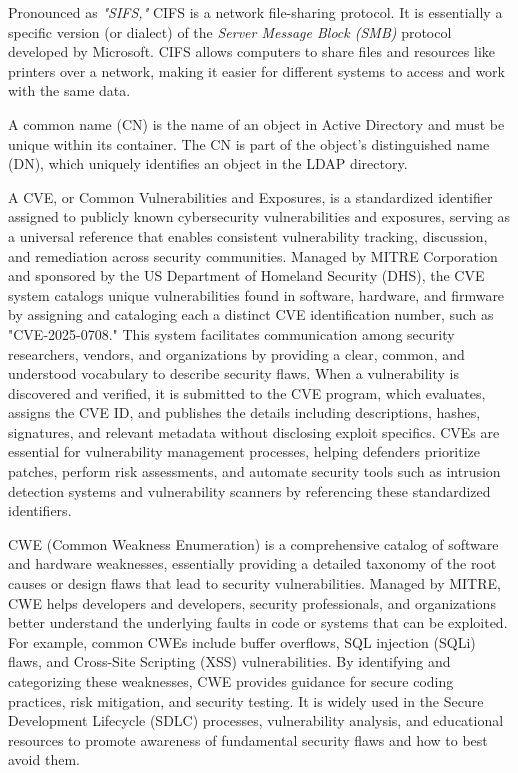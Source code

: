   Pronounced as \textit{"SIFS,"} CIFS is a network file-sharing protocol. It is essentially a specific version (or dialect) of the \textit{Server Message Block (SMB)} protocol developed by Microsoft. CIFS allows computers to share files and resources like printers over a network, making it easier for different systems to access and work with the same data.

 A common name (CN) is the name of an object in Active Directory and must be unique within its container. The CN is part of the object’s distinguished name (DN), which uniquely identifies an object in the LDAP directory. 

 A CVE, or Common Vulnerabilities and Exposures, is a standardized identifier assigned to publicly known cybersecurity vulnerabilities and exposures, serving as a universal reference that enables consistent vulnerability tracking, discussion, and remediation across security communities. Managed by MITRE Corporation and sponsored by the US Department of Homeland Security (DHS), the CVE system catalogs unique vulnerabilities found in software, hardware, and firmware by assigning and cataloging each a distinct CVE identification number, such as "CVE-2025-0708." This system facilitates communication among security researchers, vendors, and organizations by providing a clear, common, and understood vocabulary to describe security flaws. When a vulnerability is discovered and verified, it is submitted to the CVE program, which evaluates, assigns the CVE ID, and publishes the details including descriptions, hashes, signatures, and relevant metadata without disclosing exploit specifics. CVEs are essential for vulnerability management processes, helping defenders prioritize patches, perform risk assessments, and automate security tools such as intrusion detection systems and vulnerability scanners by referencing these standardized identifiers.

 CWE (Common Weakness Enumeration) is a comprehensive catalog of software and hardware weaknesses, essentially providing a detailed taxonomy of the root causes or design flaws that lead to security vulnerabilities. Managed by MITRE, CWE helps developers and developers, security professionals, and organizations better understand the underlying faults in code or systems that can be exploited. For example, common CWEs include buffer overflows, SQL injection (SQLi) flaws, and Cross-Site Scripting (XSS) vulnerabilities. By identifying and categorizing these weaknesses, CWE provides guidance for secure coding practices, risk mitigation, and security testing. It is widely used in the Secure Development Lifecycle (SDLC) processes, vulnerability analysis, and educational resources to promote awareness of fundamental security flaws and how to best avoid them.

